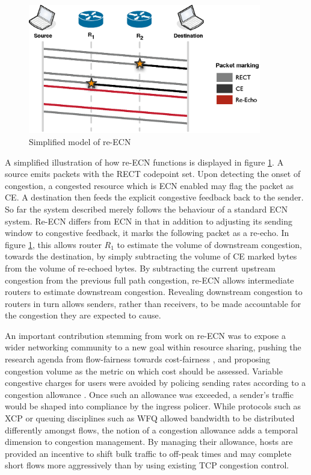 \begin{figure}
    \centering
    \includegraphics[width=4.0in]{figures/resourcepooling/reecn}
    \caption{Simplified model of re-ECN}
    \label{fig:reecn}
\end{figure}

A simplified illustration of how re-\ac{ECN} functions is displayed in figure \ref{fig:reecn}.
A source emits packets with the \ac{RECT} codepoint set.
Upon detecting the onset of congestion, a congested resource which is \ac{ECN} enabled may flag the packet as \ac{CE}.
A destination then feeds the explicit congestive feedback back to the sender.
So far the system described merely follows the behaviour of a standard \ac{ECN} system.
Re-\ac{ECN} differs from \ac{ECN} in that in addition to adjusting its sending window to congestive feedback, it marks the following packet as a re-echo.
In figure \ref{fig:reecn}, this allows router $R_1$ to estimate the volume of downstream congestion, towards the destination, by simply subtracting the volume of \ac{CE} marked bytes from the volume of re-echoed bytes.
By subtracting the current upstream congestion from the previous full path congestion, re-{ECN} allows intermediate routers to estimate downstream congestion.
Revealing downstream congestion to routers in turn allows senders, rather than receivers, to be made accountable for the congestion they are expected to cause.

An important contribution stemming from work on re-\ac{ECN} was to expose a wider networking community to a new goal within resource sharing, pushing the research agenda from flow-fairness towards cost-fairness \cite{Briscoe:2007p261}, and proposing congestion volume as the metric on which cost should be assessed.
Variable congestive charges for users were avoided by policing sending rates according to a congestion allowance \cite{Jacquet:2008p341}.
Once such an allowance was exceeded, a sender's traffic would be shaped into compliance by the ingress policer.
While protocols such as \ac{XCP} or queuing disciplines such as \ac{WFQ} allowed bandwidth to be distributed differently amongst flows, the notion of a congestion allowance adds a temporal dimension to congestion management.
By managing their allowance, hosts are provided an incentive to shift bulk traffic to off-peak times and may complete short flows more aggressively than by using existing \ac{TCP} congestion control.

